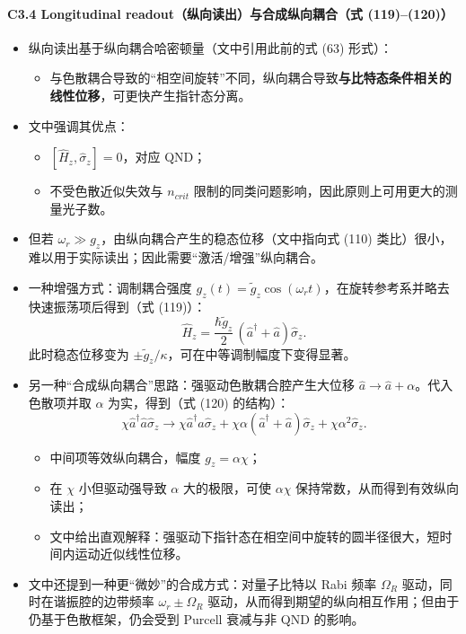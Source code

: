 \documentclass[12pt,a4paper,oneside]{ctexbook}
\providecommand{\tightlist}{%
  \setlength{\itemsep}{0pt}\setlength{\parskip}{0pt}}
\let\oldparagraph\paragraph
\renewcommand{\paragraph}[1]{\oldparagraph{#1}\mbox{}}
\begin{document}
\paragraph{C3.4 Longitudinal readout（纵向读出）与合成纵向耦合（式
(119)--(120)）}\label{c3.4-longitudinal-readoutux7eb5ux5411ux8bfbux51faux4e0eux5408ux6210ux7eb5ux5411ux8026ux5408ux5f0f-119120}

\begin{itemize}
\tightlist
\item
  纵向读出基于纵向耦合哈密顿量（文中引用此前的式 (63) 形式）：

  \begin{itemize}
  \tightlist
  \item
    与色散耦合导致的``相空间旋转''不同，纵向耦合导致\textbf{与比特态条件相关的线性位移}，可更快产生指针态分离。
  \end{itemize}
\item
  文中强调其优点：

  \begin{itemize}
  \tightlist
  \item
    \([\hat{H}_z,\hat{\sigma}_z]=0\)，对应 QND；
  \item
    不受色散近似失效与 \(n_{crit}\)
    限制的同类问题影响，因此原则上可用更大的测量光子数。
  \end{itemize}
\item
  但若 \(\omega_r\gg g_z\)，由纵向耦合产生的稳态位移（文中指向式 (110)
  类比）很小，难以用于实际读出；因此需要``激活/增强''纵向耦合。
\item
  一种增强方式：调制耦合强度
  \(g_z(t)=\tilde{g}_z\cos(\omega_r t)\)，在旋转参考系并略去快速振荡项后得到（式
  (119)）： \[
  \hat{H}_z=\frac{\hbar\tilde{g}_z}{2}\,(\hat{a}^\dagger+\hat{a})\hat{\sigma}_z .
  \] 此时稳态位移变为
  \(\pm \tilde{g}_z/\kappa\)，可在中等调制幅度下变得显著。
\item
  另一种``合成纵向耦合''思路：强驱动色散耦合腔产生大位移
  \(\hat{a}\rightarrow \hat{a}+\alpha\)。代入色散项并取 \(\alpha\)
  为实，得到（式 (120) 的结构）： \[
  \chi \hat{a}^\dagger\hat{a}\hat{\sigma}_z
  \rightarrow
  \chi \hat{a}^\dagger\hat{a}\hat{\sigma}_z
  +\chi\alpha(\hat{a}^\dagger+\hat{a})\hat{\sigma}_z
  +\chi\alpha^2\hat{\sigma}_z .
  \]

  \begin{itemize}
  \tightlist
  \item
    中间项等效纵向耦合，幅度 \(g_z=\alpha\chi\)；
  \item
    在 \(\chi\) 小但驱动强导致 \(\alpha\) 大的极限，可使 \(\alpha\chi\)
    保持常数，从而得到有效纵向读出；
  \item
    文中给出直观解释：强驱动下指针态在相空间中旋转的圆半径很大，短时间内运动近似线性位移。
  \end{itemize}
\item
  文中还提到一种更``微妙''的合成方式：对量子比特以 Rabi 频率
  \(\Omega_R\) 驱动，同时在谐振腔的边带频率 \(\omega_r\pm\Omega_R\)
  驱动，从而得到期望的纵向相互作用；但由于仍基于色散框架，仍会受到
  Purcell 衰减与非 QND 的影响。
\end{itemize}
\end{document}
